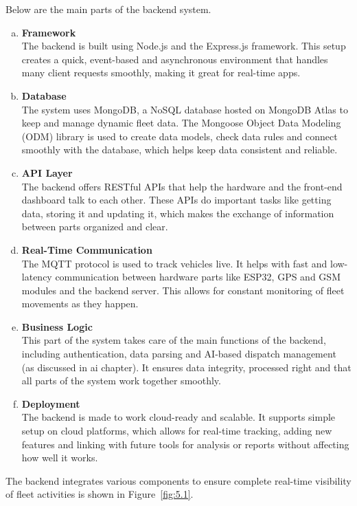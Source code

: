 Below are the main parts of the backend system.
\begin{enumerate}[a)]
    \item \textbf{Framework} \\
    The backend is built using Node.js and the Express.js framework. This setup creates a quick, event-based and asynchronous environment that handles many client requests smoothly, making it great for real-time apps.
    \item \textbf{Database} \\
    The system uses MongoDB, a NoSQL database hosted on MongoDB Atlas to keep and manage dynamic fleet data. The Mongoose Object Data Modeling (ODM) library is used to create data models, check data rules and connect smoothly with the database, which helps keep data consistent and reliable.
    \item \textbf{API Layer} \\
    The backend offers RESTful APIs that help the hardware and the front-end dashboard talk to each other. These APIs do important tasks like getting data, storing it and updating it, which makes the exchange of information between parts organized and clear.
    \item \textbf{Real-Time Communication} \\
    The MQTT protocol is used to track vehicles live. It helps with fast and low-latency communication between hardware parts like ESP32, GPS and GSM modules and the backend server. This allows for constant monitoring of fleet movements as they happen.
    \item \textbf{Business Logic} \\
    This part of the system takes care of the main functions of the backend, including authentication, data parsing and AI-based dispatch management (as discussed in ai chapter). It ensures data integrity, processed right and that all parts of the system work together smoothly.
    \item \textbf{Deployment} \\
    The backend is made to work cloud-ready and scalable. It supports simple setup on cloud platforms, which allows for real-time tracking, adding new features and linking with future tools for analysis or reports without affecting how well it works.
\end{enumerate}

The backend integrates various components to ensure complete real-time visibility of fleet activities is shown in Figure~\ref{fig:5.1}.

